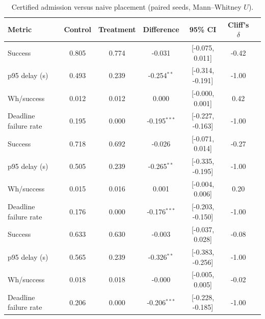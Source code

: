 \begin{table}
\centering
\small
\caption{Certified admission versus naive placement (paired seeds, Mann--Whitney $U$).}
\label{tab:p3-tests}
\begin{tabular}{lcccccc}
\toprule
Metric & Control & Treatment & Difference & 95\% CI & Cliff's $\delta$ \\
\midrule
Success & 0.805 & 0.774 & -0.031 & [-0.075, 0.011] & -0.42 \\
p95 delay (s) & 0.493 & 0.239 & -0.254$^{**}$ & [-0.314, -0.191] & -1.00 \\
Wh/success & 0.012 & 0.012 & 0.000 & [-0.000, 0.001] & 0.42 \\
Deadline failure rate & 0.195 & 0.000 & -0.195$^{***}$ & [-0.227, -0.163] & -1.00 \\
Success & 0.718 & 0.692 & -0.026 & [-0.071, 0.014] & -0.27 \\
p95 delay (s) & 0.505 & 0.239 & -0.265$^{**}$ & [-0.335, -0.195] & -1.00 \\
Wh/success & 0.015 & 0.016 & 0.001 & [-0.004, 0.006] & 0.20 \\
Deadline failure rate & 0.176 & 0.000 & -0.176$^{***}$ & [-0.203, -0.150] & -1.00 \\
Success & 0.633 & 0.630 & -0.003 & [-0.037, 0.028] & -0.08 \\
p95 delay (s) & 0.565 & 0.239 & -0.326$^{**}$ & [-0.383, -0.256] & -1.00 \\
Wh/success & 0.018 & 0.018 & -0.000 & [-0.005, 0.005] & -0.02 \\
Deadline failure rate & 0.206 & 0.000 & -0.206$^{***}$ & [-0.228, -0.185] & -1.00 \\
\bottomrule
\end{tabular}
\par{}
\end{table}
